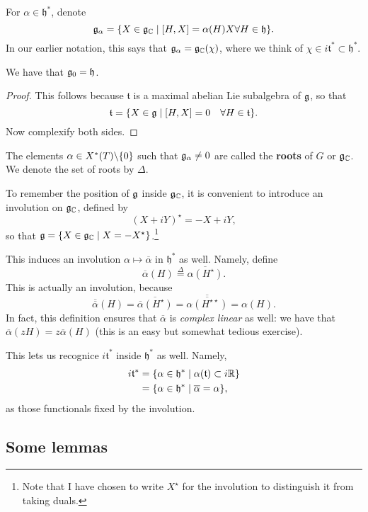 \documentclass[11pt, english]{article}
\begin{document}
For $\alpha \in \mathfrak h^\ast$, denote
$$
\mathfrak g_\alpha = \{ X \in \mathfrak g_{\mathbb{C}} \mid [H,X] = \alpha(H)X \forall H \in \mathfrak h \}.
$$
In our earlier notation, this says that $\mathfrak g_{\alpha} = \mathfrak g_{\mathbb{C}}(\chi)$, where we think of $\chi \in i \mathfrak t^\ast \subset \mathfrak h^\ast$.

\begin{lemma}
We have that $\mathfrak g_0 = \mathfrak h$.
\end{lemma}
\begin{proof}
 This follows because $\mathfrak t$ is a maximal abelian Lie subalgebra of $\mathfrak g$, so that
$$
\mathfrak t = \{ X \in \mathfrak g \mid [H,X] = 0 \quad \forall H \in \mathfrak t \}.
$$
Now complexify both sides.
\end{proof}

The elements $\alpha \in X^\ast(T) \backslash \{ 0 \}$ such that $\mathfrak g_\alpha \neq 0$ are called the \textbf{roots} of $G$ or $\mathfrak g_{\mathbb{C}}$. We denote the set of roots by $\Delta$. 

To remember the position of $\mathfrak g$ inside $\mathfrak g_{\mathbb{C}}$, it is convenient to introduce an involution on $\mathfrak g_{\mathbb{C}}$, defined by
$$
(X+iY)^\star = -X + iY,
$$
so that $\mathfrak g = \{ X \in \mathfrak g_{\mathbb{C}} \mid X = -X^\star \}$.\footnote{Note that I have chosen to write $X^\star$ for the involution to distinguish it from taking duals.}

This induces an involution $\alpha \mapsto \overline \alpha$ in $\mathfrak h^\ast$ as well. Namely, define
$$
\overline \alpha(H) \stackrel{\Delta}{=} \overline{\alpha(H^\star)}.
$$
This is actually an involution, because
$$
\overline{\overline \alpha}(H) = \overline{\overline \alpha(H^\star)} = \overline{\overline{\alpha(H^{\star \star})}} = \alpha(H).
$$
In fact, this definition ensures that $\overline{\alpha}$ is \emph{complex linear} as well: we have that $\overline \alpha (zH) = z \overline \alpha(H)$ (this is an easy but somewhat tedious exercise).

This lets us recognice $i \mathfrak t^\ast$ inside $\mathfrak h^\ast$ as well. Namely,
\begin{align*}
  i \mathfrak t^\ast &= \{ \alpha \in \mathfrak h^\ast \mid \alpha(\mathfrak t) \subset i \mathbb{R} \} \\
&= \{ \alpha \in \mathfrak h ^\ast \mid \overline \alpha = \alpha \},
\end{align*}
as those functionals fixed by the involution.

\subsection{Some lemmas}
\end{document}
